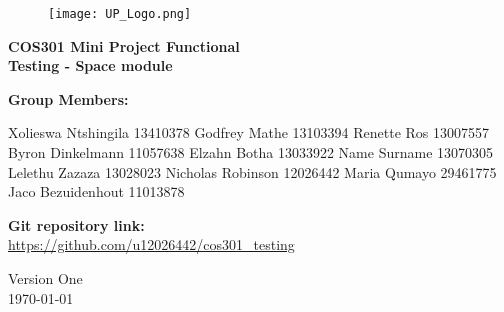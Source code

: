 \begin{titlepage}
	\begin{center}
		
		\begin{figure}[t]
			\centering
			\texttt{[image: UP\_Logo.png]}
		\end{figure}		
		
		\textbf{\LARGE COS301 Mini Project Functional \\Testing - Space module\\}
		
		\vspace{1 cm}
		
		\LARGE{\textbf{Group Members: }}
		

		\begin{flushright} \large
			Xolieswa Ntshingila 13410378\newline
			Godfrey Mathe 13103394 \newline
			Renette Ros 13007557\newline
			Byron Dinkelmann 11057638\newline
			Elzahn Botha 13033922\newline
			Name Surname 13070305\newline
			Lelethu Zazaza 13028023\newline
			Nicholas Robinson 12026442\newline
			Maria Qumayo 29461775\newline
			Jaco Bezuidenhout 11013878\newline
		\end{flushright}
		
	
		
		\textbf{Git repository link:\\}
		 \url{ https://github.com/u12026442/cos301_testing}
		
		\vfill
		
		{\LARGE Version One}
		\\
		{\large \today}		
		
		
	\end{center}
\end{titlepage}
